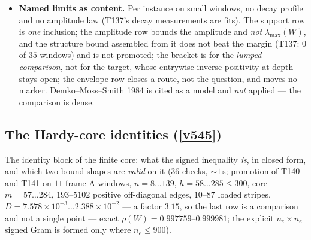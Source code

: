 \documentclass[11pt,a4paper]{article}
\begin{document}
\begin{itemize}[leftmargin=1.5em]
$\rho(E)=\lambda_{\max}(W)\le0.99995781$: the absolute value alone destroys the cancellation, and what
survives is a sign-preserving bound that does not exist yet.
\item \textbf{Named limits as content.} Per instance on small windows, no decay profile and no
amplitude law (T137's decay measurements are fits). The support row is \emph{one} inclusion; the
amplitude row bounds the amplitude and \emph{not} $\lambda_{\max}(W)$, and the structure bound
assembled from it does not beat the margin (T137: $0$ of $35$ windows) and is not promoted; the
bracket is for the \emph{lumped comparison}, not for the target, whose entrywise inverse positivity at
depth stays open; the envelope row closes a route, not the question, and moves no marker.
Demko--Moss--Smith 1984 is cited as a model and \emph{not} applied --- the comparison is dense.
\end{itemize}

\subsection{The Hardy-core identities (\texorpdfstring{\vref{v545}}{v545})}\label{sec:v545}
The identity block of the finite core: what the signed inequality \emph{is}, in closed form, and
which two bound shapes are \emph{valid} on it  ($36$ checks,
${\sim}1$\,s; promotion of T140 and T141 on $11$ frame-A windows, $n=8\ldots139$,
$h=58\ldots285\le300$, core $m=57\ldots284$, $193$--$5102$ positive off-diagonal edges, $10$--$87$
loaded stripes, $D=7.578\times10^{-3}\ldots2.388\times10^{-2}$ --- a factor $3.15$, so the last row
is a comparison and not a single point --- exact $\rho(W)=0.997759$--$0.999981$; the explicit
$n_e\times n_e$ signed Gram is formed only where $n_e\le900$).
\end{document}

